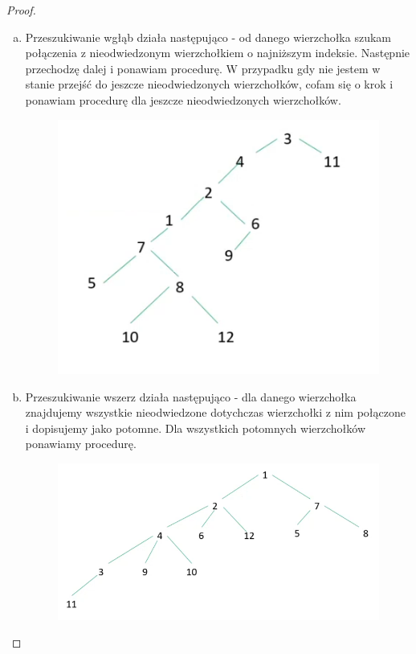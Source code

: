 \documentclass[11pt]{article}
\theoremstyle{definition}
\begin{document}
\begin{proof}
\begin{enumerate}[a)]
\item Przeszukiwanie wgłąb działa następująco - od danego wierzchołka szukam połączenia z nieodwiedzonym wierzchołkiem o najniższym indeksie. Następnie przechodzę dalej i ponawiam procedurę. W przypadku gdy nie jestem w stanie przejść do jeszcze nieodwiedzonych wierzchołków, cofam się o krok i ponawiam procedurę dla jeszcze nieodwiedzonych wierzchołków.

\begin{figure}[H]
\centering
\includegraphics[width=0.5\linewidth]{./data/tree_a.png}
\end{figure}

\item Przeszukiwanie wszerz działa następująco - dla danego wierzchołka znajdujemy wszystkie nieodwiedzone dotychczas wierzchołki z nim połączone i dopisujemy jako potomne. Dla wszystkich potomnych wierzchołków ponawiamy procedurę.

\begin{figure}[H]
\centering
\includegraphics[width=0.5\linewidth]{./data/tree_b.png}
\end{figure}
\end{enumerate}
\end{proof}
\end{document}
